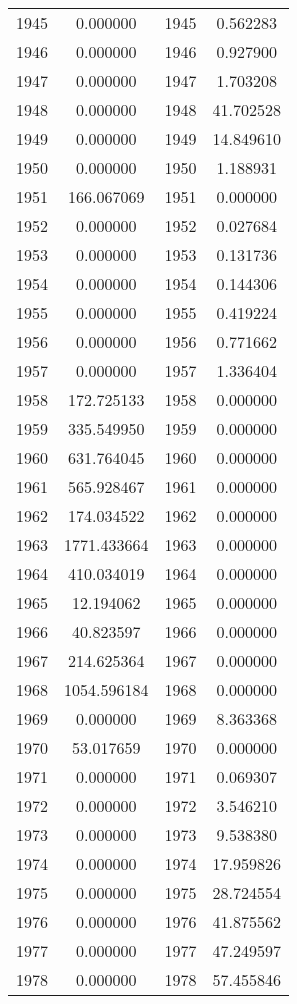 \documentclass[12pt]{article}
\begin{document}
\begin{longtable}{@{}cccc@{}}
1945 & 0.000000 & 1945 & 0.562283 \\
1946 & 0.000000 & 1946 & 0.927900 \\
1947 & 0.000000 & 1947 & 1.703208 \\
1948 & 0.000000 & 1948 & 41.702528 \\
1949 & 0.000000 & 1949 & 14.849610 \\
1950 & 0.000000 & 1950 & 1.188931 \\
1951 & 166.067069 & 1951 & 0.000000 \\
1952 & 0.000000 & 1952 & 0.027684 \\
1953 & 0.000000 & 1953 & 0.131736 \\
1954 & 0.000000 & 1954 & 0.144306 \\
1955 & 0.000000 & 1955 & 0.419224 \\
1956 & 0.000000 & 1956 & 0.771662 \\
1957 & 0.000000 & 1957 & 1.336404 \\
1958 & 172.725133 & 1958 & 0.000000 \\
1959 & 335.549950 & 1959 & 0.000000 \\
1960 & 631.764045 & 1960 & 0.000000 \\
1961 & 565.928467 & 1961 & 0.000000 \\
1962 & 174.034522 & 1962 & 0.000000 \\
1963 & 1771.433664 & 1963 & 0.000000 \\
1964 & 410.034019 & 1964 & 0.000000 \\
1965 & 12.194062 & 1965 & 0.000000 \\
1966 & 40.823597 & 1966 & 0.000000 \\
1967 & 214.625364 & 1967 & 0.000000 \\
1968 & 1054.596184 & 1968 & 0.000000 \\
1969 & 0.000000 & 1969 & 8.363368 \\
1970 & 53.017659 & 1970 & 0.000000 \\
1971 & 0.000000 & 1971 & 0.069307 \\
1972 & 0.000000 & 1972 & 3.546210 \\
1973 & 0.000000 & 1973 & 9.538380 \\
1974 & 0.000000 & 1974 & 17.959826 \\
1975 & 0.000000 & 1975 & 28.724554 \\
1976 & 0.000000 & 1976 & 41.875562 \\
1977 & 0.000000 & 1977 & 47.249597 \\
1978 & 0.000000 & 1978 & 57.455846 \\

\end{longtable}
\end{document}
